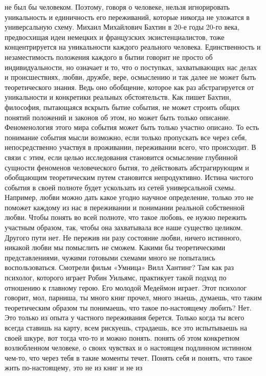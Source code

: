 не был бы человеком. Поэтому, говоря о человеке, нельзя игнорировать
уникальность и единичность его переживаний, которые никогда не уложатся в
универсальную схему. Михаил Михайлович Бахтин в 20-е годы 20-го века,
предвосхищая идеи немецких и французских экзистенциалистов, тоже концентрируется
на уникальности каждого реального человека. Единственность и незаместимость
положения каждого в бытии говорит не просто об индивидуальности, но означает и
то, что о поступках, захватывающих нас делах и происшествиях, любви, дружбе,
вере, осмыслению и так далее не может быть теоретического знания. Ведь оно
обобщение, которое как раз абстрагируется от уникальности и конкретики реальных
обстоятельств. Как пишет Бахтин, философия, пытающаяся вскрыть бытие события, не
может строить общих понятий положений и законов об этом, но может быть только
описание. Феноменология этого мира события может быть только участно описано. То
есть понимание события мысли возможно, если только пропускать все через себя,
непосредственно участвуя в проживании, переживании всего, что происходит. В
связи с этим, если целью исследования становится осмысление глубинной сущности
феноменов человеческого бытия, то действовать абстрагирующим и обобщающим
теоретическим путем становится непродуктивно. Истина чистого события в своей
полноте будет ускользать из сетей универсальной схемы. Например, любви можно
дать какое угодно научное определение, только это не поможет каждому из нас в
переживании и понимании реальной собственной любви. Чтобы понять во всей
полноте, что такое любовь, ее нужно пережить участным образом, так, чтобы она
захватывала все наше существо целиком. Другого пути нет. Не пережив ни разу
состояние любви, ничего истинного, никакой любви мы помыслить не сможем. Какими
бы теоретическими представлениями, чужими готовыми схемами много не попытались
воспользоваться. Смотрели фильм «Умница» Вилл Хантинг? Там как раз психолог,
которого играет Робин Уильямс, практикует такой подход по отношению к главному
герою. Его молодой Медеймон играет. Этот психолог говорит, мол, парниша, ты
много книг прочел, много знаешь, думаешь, что таким теоретическим образом ты
понимаешь, что такое по-настоящему любить? Нет. Это только из опыта у частного
переживания берется. Только когда ты всего всегда ставишь на карту, всем
рискуешь, страдаешь, все это испытываешь на своей шкуре, вот тогда что-то и
можно понять. понять об этом конкретном возлюбленном человеке, о своих чувствах
и о настоящем подлинном истинном чем-то, что через тебя в такие моменты течет.
Понять себя и понять, что такое жить по-настоящему, это не из книг и не из
